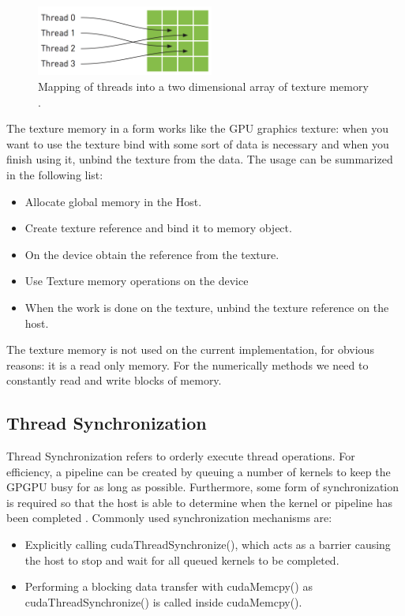 \begin{figure}[htbp]
	\centering
		\includegraphics[width=0.52\textwidth]{Figures/texture.png}
		\smallskip
	\caption[Texture memory]{Mapping of threads into a two dimensional array of texture memory \cite{hwu}.}
	\label{fig:texture}
\end{figure}

The texture memory in a form works like the GPU graphics texture: when you want to use the texture bind with some sort of data is necessary and when you finish using it, unbind the texture from the data. The usage can be summarized in the following list:

\begin{itemize}
\item Allocate global memory in the Host.
\item Create texture reference and bind it to memory object.
\item On the device obtain the reference from the texture.
\item  Use Texture memory operations on the device
\item  When the work is done on the texture, unbind the texture reference on the host.
\end{itemize}

The texture memory is not used on the current implementation, for obvious reasons: it is a read only memory. For the numerically methods we need to constantly read and write blocks of memory.

\subsection{Thread Synchronization}

Thread Synchronization refers to orderly execute thread operations. For efficiency, a pipeline can be created by queuing a number of kernels to keep the GPGPU busy for as long as possible. Furthermore, some form of synchronization is required so that the host is able to determine when the kernel or pipeline has been completed \cite{design}. Commonly used synchronization mechanisms are:

\begin{itemize}
  \item Explicitly calling {\listf cudaThreadSynchronize()}, which acts as a barrier causing the host to stop and wait for all queued kernels to be completed.
  \item Performing a blocking data transfer with {\listf cudaMemcpy()} as {\listf cudaThreadSynchronize()} is called inside {\listf cudaMemcpy()}.
\end{itemize}

